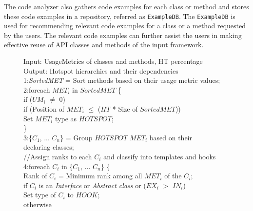\documentclass[conference]{IEEEtran}
\newcommand{\CodeIn}[1]{{\small\texttt{#1}}}
\newenvironment{CodeOut}{\begin{small}}{\end{small}}
\begin{document}
The code analyzer also gathers code examples for each class or method and 
stores these code examples in a repository, referred as \CodeIn{ExampleDB}. The \CodeIn{ExampleDB} is used
for recommending relevant code examples for a class or a method requested by the users. The relevant
code examples can further assist the users in making effective reuse of API classes and methods of the
input framework. 

\begin{figure}[t]
\begin{CodeOut}
Input: UsageMetrics of classes and methods, HT percentage\\
Output: Hotspot hierarchies and their dependencies\\
1:\emph{SortedMET} = Sort methods based on their usage metric values;\\
2:foreach \emph{$MET_i$} in $SortedMET$ \{\\
\hspace*{0.3in}if ($UM_i$ $\neq$ 0) \\
\hspace*{0.5in}if (Position of $MET_i$ $\leq$ ($HT$ * Size of $SortedMET$))\\
\hspace*{0.8in}Set $MET_i$ type as $HOTSPOT$; \\
\hspace*{0.2in}\}\\
3:\{$C_1$, ... $C_n$\} = Group $HOTSPOT$ $MET_i$ based on their \\\hspace*{0.2in}declaring classes;\\
//Assign ranks to each $C_i$ and classify into templates and hooks\\
4:foreach \emph{$C_i$} in \{$C_1$, ... $C_n$\} \{\\
\hspace*{0.3in}Rank of $C_i$ = Minimum rank among all $MET_i$ of the $C_i$;\\
\hspace*{0.3in}if $C_i$ is an \emph{Interface} or \emph{Abstract class} or ($EX_i$ $>$ $IN_i$)\\
\hspace*{0.5in}Set type of $C_i$ to $HOOK$;\\
\hspace*{0.3in}otherwise\\ 

\end{CodeOut}
\end{figure}
\end{document}
